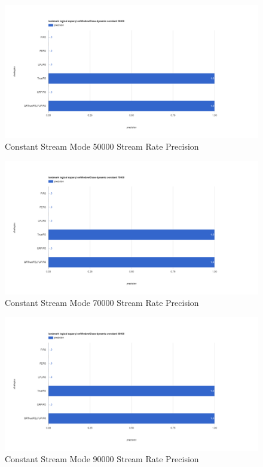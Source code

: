 \begin{figure}[!htbp]
    \centering
    \includegraphics[width=\textwidth]{img/app3-c-50000-p.png}
    \caption{Constant Stream Mode 50000 Stream Rate Precision}
\end{figure}
\begin{figure}[!htbp]
    \centering
    \includegraphics[width=\textwidth]{img/app3-c-70000-p.png}
    \caption{Constant Stream Mode 70000 Stream Rate Precision}
\end{figure}
\begin{figure}[!htbp]
    \centering
    \includegraphics[width=\textwidth]{img/app3-c-90000-p.png}
    \caption{Constant Stream Mode 90000 Stream Rate Precision}
\end{figure}
